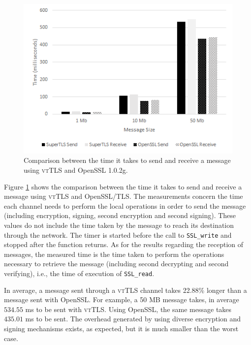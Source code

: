 \documentclass{sig-alternate-05-2015}
\newcommand{\suite}[1]{\texttt{{\footnotesize #1}}}
\begin{document}
\begin{figure}[t]
\includegraphics[width=\columnwidth]{eval_time_2_bw}
\centering
\caption{Comparison between the time it takes to send and receive a message using \textsc{vtTLS} and OpenSSL 1.0.2g.}
\label{fig:eval_time_2}
\end{figure}

Figure \ref{fig:eval_time_2} shows the comparison between the time it takes to send and receive a message using \textsc{vtTLS} and
OpenSSL/TLS.
The measurements concern the time each channel needs to perform the local operations in order to send the message (including encryption, signing, second encryption and second signing). These values do not include the time taken by the message to reach its destination through the network. The timer is started before the call to \suite{SSL\_write} and stopped after the function returns.
As for the results regarding the reception of messages, the measured time is the time taken to perform the operations necessary to retrieve the message (including second decrypting and second verifying), i.e., the time of execution of \suite{SSL\_read}. 

In average, a message sent through a \textsc{vtTLS} channel takes 22.88\% longer than a message sent with OpenSSL. For example, a 50 MB message takes, in average $534.55$ ms to be sent with \textsc{vtTLS}. Using OpenSSL, the same message takes $435.01$ ms to be sent.
The overhead generated by using diverse encryption and signing mechanisms exists, as expected, but it is much smaller than the worst case.
\end{document}
